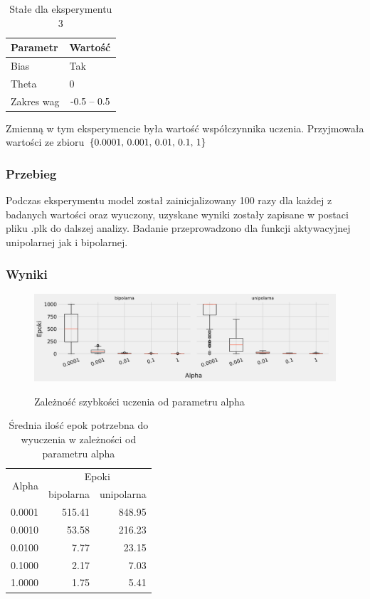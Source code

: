 \documentclass{article}
\begin{document}
\begin{table}[h]
	\caption{Stałe dla eksperymentu 3}
	\label{tabela-const-3}
	\centering
	\begin{tabular}{ll}
		\toprule
		Parametr   & Wartość         \\
		\midrule
		Bias       & Tak               \\
		Theta      & 0                 \\
		Zakres wag & \($-0.5 -- 0.5$\) \\
		\bottomrule
	\end{tabular}
\end{table}

Zmienną w tym eksperymencie była wartość współczynnika uczenia. Przyjmowała wartości ze zbioru \(\{$0.0001, 0.001, 0.01, 0.1, 1$\}\)

\subsubsection*{Przebieg}

Podczas eksperymentu model został zainicjalizowany 100 razy dla każdej z badanych wartości oraz wyuczony, uzyskane wyniki zostały zapisane w postaci pliku .plk do dalszej analizy. Badanie przeprowadzono dla funkcji aktywacyjnej unipolarnej jak i bipolarnej.

\subsubsection*{Wyniki}

\begin{figure}[h]
	\centering
	\caption{Zależność szybkości uczenia od parametru alpha}
	\includegraphics[width=\textwidth]{per_alpha.png}
	\label{fig:res3}
\end{figure}

\begin{table}[h]
	\caption{Średnia ilość epok potrzebna do wyuczenia w zależności od parametru alpha}
	\label{tabela-res-3}
	\centering
	\begin{tabular}{rrr}
		\toprule
		\multirow{2}{*}{Alpha}   & \multicolumn{2}{c}{Epoki} \\
		       & bipolarna & unipolarna \\
		\midrule
		0.0001 & 515.41    & 848.95     \\
		0.0010 & 53.58     & 216.23     \\
		0.0100 & 7.77      & 23.15      \\
		0.1000 & 2.17      & 7.03       \\
		1.0000 & 1.75      & 5.41       \\
		\bottomrule
	\end{tabular}
\end{table}
\end{document}
